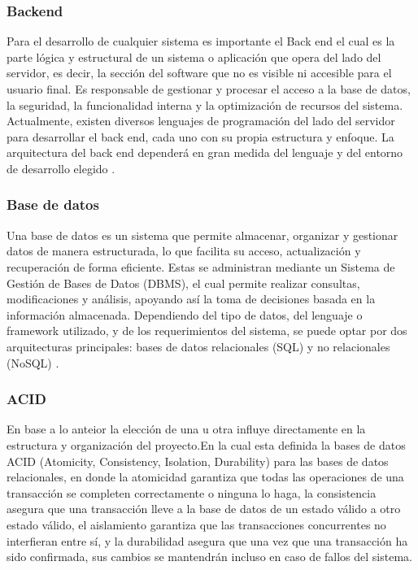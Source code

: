 \subsubsection{Backend}
Para el desarrollo de cualquier sistema es importante el Back end el cual es la parte
lógica y estructural de un sistema o aplicación que opera del lado del servidor, es
decir, la sección del software que no es visible ni accesible para el usuario final. Es
responsable de gestionar y procesar el acceso a la base de datos, la seguridad, la
funcionalidad interna y la optimización de recursos del sistema. Actualmente,
existen diversos lenguajes de programación del lado del servidor para desarrollar el
back end, cada uno con su propia estructura y enfoque. La arquitectura del back
end dependerá en gran medida del lenguaje y del entorno de desarrollo elegido \cite{CampaGarcia2024}.

\subsubsection{Base de datos}
Una base de datos es un sistema que permite almacenar, organizar y gestionar
datos de manera estructurada, lo que facilita su acceso, actualización y
recuperación de forma eficiente. Estas se administran mediante un Sistema de
Gestión de Bases de Datos (DBMS), el cual permite realizar consultas,
modificaciones y análisis, apoyando así la toma de decisiones basada en la
información almacenada. Dependiendo del tipo de datos, del lenguaje o framework
utilizado, y de los requerimientos del sistema, se puede optar por dos arquitecturas
principales: bases de datos relacionales (SQL) y no relacionales (NoSQL) \cite{CampaGarcia2024}.\newline

\subsubsection{ACID}
En base a lo anteior la elección de una u otra influye directamente en la estructura y
organización del proyecto.En la cual esta definida la bases de datos ACID (Atomicity, Consistency, Isolation, Durability) 
para las bases de datos relacionales, en donde la atomicidad garantiza que todas las operaciones de una transacción se completen correctamente o ninguna lo haga, 
la consistencia asegura que una transacción lleve a la base de datos de un estado válido a otro estado válido, 
el aislamiento garantiza que las transacciones concurrentes no interfieran entre sí, y 
la durabilidad asegura que una vez que una transacción ha sido confirmada, 
sus cambios se mantendrán incluso en caso de fallos del sistema.

